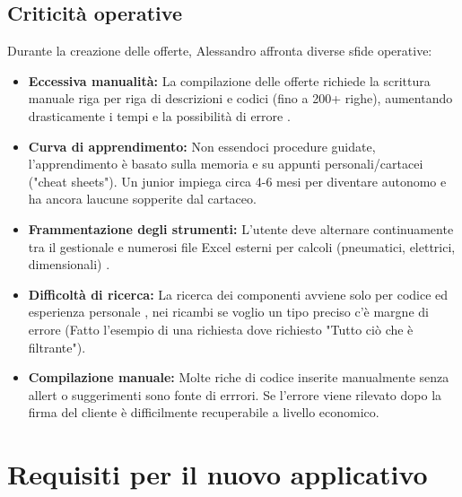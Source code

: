\documentclass[12pt, a4paper]{article} %
\begin{document}
\subsection{Criticità operative}
Durante la creazione delle offerte, Alessandro affronta diverse sfide operative:
\begin{itemize}
      \item \textbf{Eccessiva manualità:} La compilazione delle offerte richiede la scrittura manuale riga per riga di descrizioni e codici (fino a 200+ righe),
            aumentando drasticamente i tempi e la possibilità di errore .
      \item \textbf{Curva di apprendimento:} Non essendoci procedure guidate, l'apprendimento è basato sulla memoria e su appunti personali/cartacei ("cheat sheets").
            Un junior impiega circa 4-6 mesi per diventare autonomo e ha ancora laucune sopperite dal cartaceo.
      \item \textbf{Frammentazione degli strumenti:} L'utente deve alternare continuamente tra il gestionale e numerosi file Excel esterni per calcoli (pneumatici, elettrici, dimensionali) .
      \item \textbf{Difficoltà di ricerca:} La ricerca dei componenti avviene solo per codice ed esperienza personale , nei ricambi se voglio un tipo preciso c'è margne di errore
            (Fatto l'esempio di una richiesta dove richiesto "Tutto ciò che è filtrante").
      \item \textbf{Compilazione manuale:} Molte riche di codice inserite manualmente senza allert o suggerimenti sono fonte di errrori.
      Se l'errore viene rilevato dopo la firma del cliente è difficilmente recuperabile a livello economico.
\end{itemize}

\section{Requisiti per il nuovo applicativo}
\end{document}

